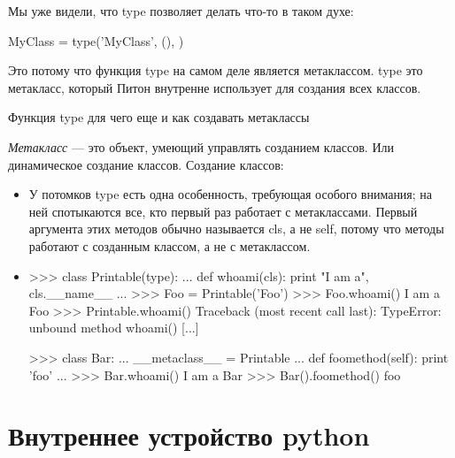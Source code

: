 Мы уже видели, что type позволяет делать что-то в таком духе:
\begin{python}
  MyClass = type('MyClass', (), {})
\end{python}

Это потому что функция type на самом деле является метаклассом. type это метакласс, который Питон внутренне использует для создания всех классов.
	
		Функция type для чего еще и как создавать метаклассы
		
		\textit{Метакласс} — это объект, умеющий управлять созданием классов. Или динамическое создание классов.
		Создание классов:
		
		\begin{itemize}
		\item {}
		У потомков type есть одна особенность, требующая особого внимания; на ней спотыкаются все, кто первый раз работает с метаклассами. Первый аргумента этих методов обычно называется cls, а не self, потому что методы работают с созданным классом, а не с метаклассом. 
		\item 
		\begin{python}
			>>> class Printable(type):
			...     def whoami(cls): print "I am a", cls.__name__
			...
			>>> Foo = Printable('Foo')
			>>> Foo.whoami()
			I am a Foo
			>>> Printable.whoami()
			Traceback (most recent call last):
			TypeError:  unbound method whoami() [...]
			
			>>> class Bar:
			...     __metaclass__ = Printable
			...     def foomethod(self): print 'foo'
			...
			>>> Bar.whoami()
			I am a Bar
			>>> Bar().foomethod()
			foo	
		\end{python}
	\end{itemize}
	
\chapter{Внутреннее устройство python}


